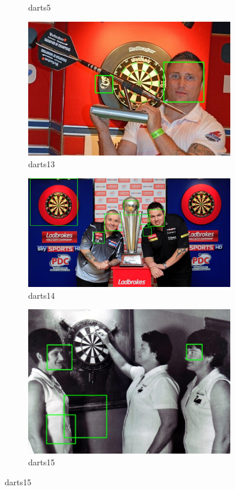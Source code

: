 \documentclass[conference]{IEEEtran}
\begin{document}
\begin{figure}[htb]
\begin{subfigure}{.5\linewidth}
  \caption{darts5}
  \label{fig:sub2}
\end{subfigure}
\begin{subfigure}{.5\linewidth}
  \centering
    \vspace{0.2cm}
  \includegraphics[width=.9\linewidth]{images/detected2.jpg}
  \caption{darts13}
  \label{fig:sub1}
\end{subfigure}%
\begin{subfigure}{.5\linewidth}
  \centering
      \vspace{0.7cm}
  \includegraphics[width=.9\linewidth]{images/detected3.jpg}
  \caption{darts14}
  \label{fig:sub2}
\end{subfigure}
\begin{subfigure}{.5\linewidth}
\centering
    \vspace{0.2cm}
\includegraphics[width=0.9\linewidth]{images/detected4.jpg}
\caption{darts15}
\end{subfigure}



\end{figure}
\end{document}
